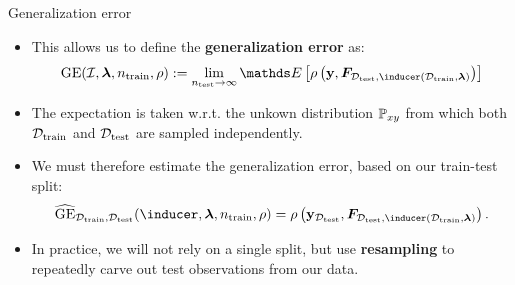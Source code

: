 \begin{vbframe}{Generalization error}

\begin{itemize}
  \item This allows us to define the \textbf{generalization error} as:
  $$\GEfull := 
  \lim_{\ntest \rightarrow \infty} \E \left[ \rho \left(
  \yv, \F_{\Dtest, \inducer(\D_{\mathrm{train}}, \lamv)} 
  \right)\right]$$
  \item The expectation is taken w.r.t. the unkown distribution $\mathbb{P}_{xy}$ from 
  which both $\mathcal{D}_{\text{train}}$ and $\mathcal{D}_{\text{test}}$ are sampled independently.
  \item We must therefore estimate the generalization error, based on our 
  train-test split:
  $$\GEh_{\Dtrain, \Dtest}(\inducer,
  \lamv, \ntrain, \rho) =
  \rho \left( \yv_{\Dtest}, \F_{\Dtest, 
  \inducer(\D_{\mathrm{train}}, \lamv)} \right).$$
  \item In practice, we will not rely on a single split, but use 
  \textbf{resampling} to repeatedly carve out test observations from our data.
\end{itemize}

\end{vbframe}



